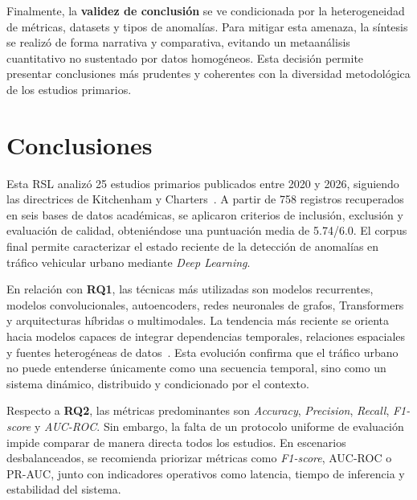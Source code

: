 \documentclass[12pt, a4paper]{article}
\begin{document}
Finalmente, la \textbf{validez de conclusi\'{o}n} se ve condicionada por la heterogeneidad de m\'{e}tricas, datasets y tipos de anomal\'{i}as. Para mitigar esta amenaza, la s\'{i}ntesis se realiz\'{o} de forma narrativa y comparativa, evitando un metaan\'{a}lisis cuantitativo no sustentado por datos homog\'{e}neos. Esta decisi\'{o}n permite presentar conclusiones m\'{a}s prudentes y coherentes con la diversidad metodol\'{o}gica de los estudios primarios.

\section{Conclusiones}
\label{sec:conclusiones}

Esta RSL analiz\'{o} 25 estudios primarios publicados entre 2020 y 2026, siguiendo las directrices de Kitchenham y Charters~\cite{Kitchenham2007}. A partir de 758 registros recuperados en seis bases de datos acad\'{e}micas, se aplicaron criterios de inclusi\'{o}n, exclusi\'{o}n y evaluaci\'{o}n de calidad, obteni\'{e}ndose una puntuaci\'{o}n media de 5.74/6.0. El corpus final permite caracterizar el estado reciente de la detecci\'{o}n de anomal\'{i}as en tr\'{a}fico vehicular urbano mediante \textit{Deep Learning}.

En relaci\'{o}n con \textbf{RQ1}, las t\'{e}cnicas m\'{a}s utilizadas son modelos recurrentes, modelos convolucionales, autoencoders, redes neuronales de grafos, Transformers y arquitecturas h\'{i}bridas o multimodales. La tendencia m\'{a}s reciente se orienta hacia modelos capaces de integrar dependencias temporales, relaciones espaciales y fuentes heterog\'{e}neas de datos~\cite{park2025graph,duan2025multimodal,chai2026road}. Esta evoluci\'{o}n confirma que el tr\'{a}fico urbano no puede entenderse \'{u}nicamente como una secuencia temporal, sino como un sistema din\'{a}mico, distribuido y condicionado por el contexto.

Respecto a \textbf{RQ2}, las m\'{e}tricas predominantes son \textit{Accuracy}, \textit{Precision}, \textit{Recall}, \textit{F1-score} y \textit{AUC-ROC}. Sin embargo, la falta de un protocolo uniforme de evaluaci\'{o}n impide comparar de manera directa todos los estudios. En escenarios desbalanceados, se recomienda priorizar m\'{e}tricas como \textit{F1-score}, AUC-ROC o PR-AUC, junto con indicadores operativos como latencia, tiempo de inferencia y estabilidad del sistema.
\end{document}
